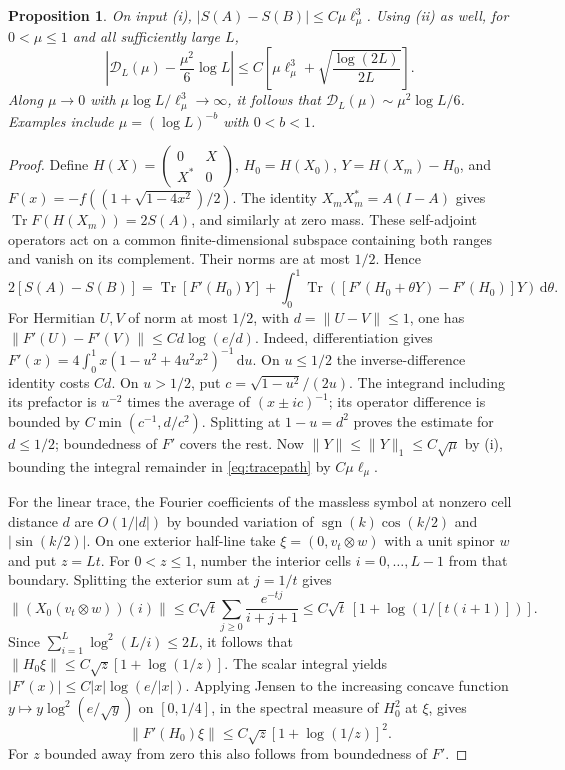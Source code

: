 \documentclass[11pt,letterpaper]{article}
\newtheorem{prop}[theorem]{Proposition}
\newcommand{\Tr}{\operatorname{Tr}}
\newcommand{\cD}{\mathcal D}
\newcommand{\dd}{\,\mathrm d}
\newcommand{\lmu}{\ell_\mu}
\begin{document}
\begin{prop}\label{prop:slow}
On input (i), \(|S(A)-S(B)|\le C\mu\lmu^3\). Using (ii) as well, for \(0<\mu\le1\) and all sufficiently large \(L\),
\[
 \left|\cD_L(\mu)-\frac{\mu^2}{6}\log L\right|
   \le C\left[\mu\lmu^3+\sqrt{\frac{\log(2L)}{2L}}\right].
\]
Along \(\mu\to0\) with \(\mu\log L/\lmu^3\to\infty\), it follows that \(\cD_L(\mu)\sim\mu^2\log L/6\). Examples include \(\mu=(\log L)^{-b}\) with \(0<b<1\).
\end{prop}
\begin{proof}
Define \(H(X)=\left(\begin{smallmatrix}0&X\\X^*&0\end{smallmatrix}\right)\),
\(H_0=H(X_0)\), \(Y=H(X_m)-H_0\), and \(F(x)=-f((1+\sqrt{1-4x^2})/2)\).
The identity \(X_m X_m^*=A(I-A)\) gives \(\Tr F(H(X_m))=2S(A)\), and similarly at zero mass. These self-adjoint operators act on a common finite-dimensional subspace containing both ranges and vanish on its complement. Their norms are at most \(1/2\). Hence
\begin{equation}
 2[S(A)-S(B)]=\Tr[F'(H_0)Y]
 +\int_0^1\Tr\!\left([F'(H_0+\theta Y)-F'(H_0)]Y\right)\dd\theta .
 \label{eq:tracepath}
\end{equation}
For Hermitian \(U,V\) of norm at most \(1/2\), with \(d=\|U-V\|\le1\), one has \(\|F'(U)-F'(V)\|\le C d\log(e/d)\). Indeed, differentiation gives \(F'(x)=4\int_0^1 x(1-u^2+4u^2x^2)^{-1}\dd u\). On \(u\le1/2\) the inverse-difference identity costs \(Cd\). On \(u>1/2\), put \(c=\sqrt{1-u^2}/(2u)\). The integrand including its prefactor is \(u^{-2}\) times the average of \((x\pm ic)^{-1}\); its operator difference is bounded by \(C\min(c^{-1},d/c^2)\). Splitting at \(1-u=d^2\) proves the estimate for \(d\le1/2\); boundedness of \(F'\) covers the rest. Now \(\|Y\|\le\|Y\|_1\le C\sqrt\mu\) by (i), bounding the integral remainder in \eqref{eq:tracepath} by \(C\mu\lmu\).

For the linear trace, the Fourier coefficients of the massless symbol at nonzero cell distance \(d\) are \(O(1/|d|)\) by bounded variation of \(\operatorname{sgn}(k)\cos(k/2)\) and \(|\sin(k/2)|\). On one exterior half-line take \(\xi=(0,v_t\otimes w)\) with a unit spinor \(w\) and put \(z=Lt\). For \(0<z\le1\), number the interior cells \(i=0,\ldots,L-1\) from that boundary. Splitting the exterior sum at \(j=1/t\) gives
\[
 \|(X_0(v_t\otimes w))(i)\|
 \le C\sqrt t\sum_{j\ge0}\frac{e^{-tj}}{i+j+1}
 \le C\sqrt t\,[1+\log(1/[t(i+1)])].
\]
Since \(\sum_{i=1}^L\log^2(L/i)\le2L\), it follows that \(\|H_0\xi\|\le C\sqrt z[1+\log(1/z)]\). The scalar integral yields \(|F'(x)|\le C|x|\log(e/|x|)\). Applying Jensen to the increasing concave function \(y\mapsto y\log^2(e/\sqrt y)\) on \([0,1/4]\), in the spectral measure of \(H_0^2\) at \(\xi\), gives
\[
 \|F'(H_0)\xi\|\le C\sqrt z[1+\log(1/z)]^2.
\]
For \(z\) bounded away from zero this also follows from boundedness of \(F'\).


\end{proof}
\end{document}
